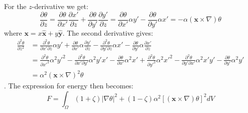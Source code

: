 \documentclass[reqno]{article}
\begin{document}
For the $z$-derivative we get:
\begin{equation}
    \frac{\partial \theta}{\partial z}
    =
    \frac{\partial \theta}{\partial x'} \frac{\partial x'}{\partial z}
    +
    \frac{\partial \theta}{\partial y'} \frac{\partial y'}{\partial z}
    =
    \frac{\partial \theta}{\partial x'} \alpha y'
    -
    \frac{\partial \theta}{\partial y'} \alpha x'
    =
    - \alpha \left( \mathbf x \times \nabla \right) \theta
\end{equation}
where $\mathbf x = x \mathbf{\hat x} + y \mathbf{\hat y}$.
The second derivative gives:
\begin{equation}
\begin{split}
    \frac{\partial^2 \theta}{\partial z^2}
    &=
    \frac{\partial^2 \theta}{\partial x' \partial z} \alpha y'
    + 
    \frac{\partial \theta}{\partial x'} \alpha \frac{\partial y'}{\partial z}
    - 
    \frac{\partial^2 \theta}{\partial y' \partial z} \alpha x'
    -
    \frac{\partial \theta}{\partial y'} \alpha \frac{\partial x'}{\partial z} \\
    &=
    \frac{\partial^2 \theta}{\partial x'^2} \alpha^2 y'^2
    - 
    \frac{\partial^2 \theta}{\partial x' \partial y'} \alpha^2 y' x'
    -
    \frac{\partial \theta}{\partial x'} \alpha^2 x'
    + 
    \frac{\partial^2 \theta}{\partial y'^2} \alpha^2 x'^2
    -
    \frac{\partial^2 \theta}{\partial y' \partial x'} \alpha^2 x' y'
    -
    \frac{\partial \theta}{\partial y'} \alpha^2 y' \\
    &=
    \alpha^2 \left( \mathbf x \times \nabla \right)^2 \theta
\end{split}
\end{equation}
.
The expression for energy then becomes:
\begin{equation} \label{eq:constant-twist-free-energy}
    F
    =
    \int_\Omega
    (1 + \zeta) \left| \nabla \theta \right|^2
    + (1 - \zeta) \alpha^2 \left[ \left( \mathbf x \times \nabla \right) \theta \right]^2 dV
\end{equation}
\end{document}
